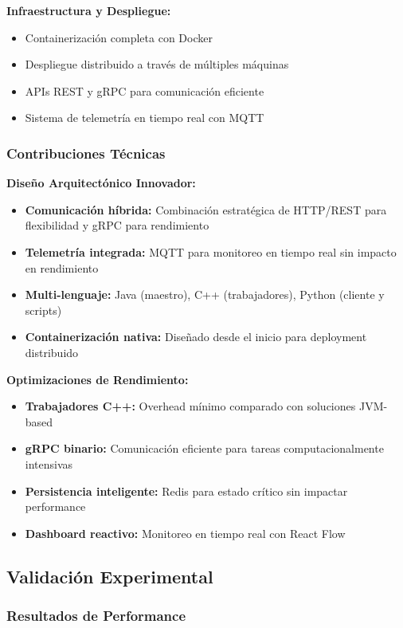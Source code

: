 \textbf{Infraestructura y Despliegue:}
\begin{itemize}
    \item Containerización completa con Docker
    \item Despliegue distribuido a través de múltiples máquinas
    \item APIs REST y gRPC para comunicación eficiente
    \item Sistema de telemetría en tiempo real con MQTT
\end{itemize}

\subsubsection{Contribuciones Técnicas}

\textbf{Diseño Arquitectónico Innovador:}
\begin{itemize}
    \item \textbf{Comunicación híbrida:} Combinación estratégica de HTTP/REST para flexibilidad y gRPC para rendimiento
    \item \textbf{Telemetría integrada:} MQTT para monitoreo en tiempo real sin impacto en rendimiento
    \item \textbf{Multi-lenguaje:} Java (maestro), C++ (trabajadores), Python (cliente y scripts)
    \item \textbf{Containerización nativa:} Diseñado desde el inicio para deployment distribuido
\end{itemize}

\textbf{Optimizaciones de Rendimiento:}
\begin{itemize}
    \item \textbf{Trabajadores C++:} Overhead mínimo comparado con soluciones JVM-based
    \item \textbf{gRPC binario:} Comunicación eficiente para tareas computacionalmente intensivas
    \item \textbf{Persistencia inteligente:} Redis para estado crítico sin impactar performance
    \item \textbf{Dashboard reactivo:} Monitoreo en tiempo real con React Flow
\end{itemize}

\subsection{Validación Experimental}

\subsubsection{Resultados de Performance}

